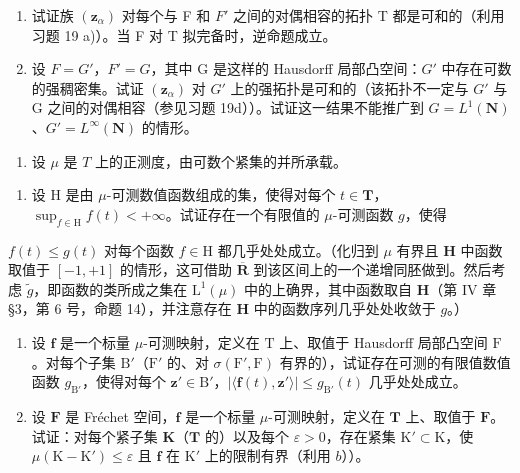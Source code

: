 \begin{enumerate}
\def\labelenumi{\alph{enumi})}
\item
  试证族 \((\mathbf{z}_{\alpha})\) 对每个与 F 和 \(F'\) 之间的对偶相容的拓扑 T 都是可和的（利用习题 19 a)）。当 F 对 T 拟完备时，逆命题成立。
\item
  设 \(F = G'\)，\(F' = G\)，其中 G 是这样的 Hausdorff 局部凸空间：\(G'\) 中存在可数的强稠密集。试证 \((\mathbf{z}_{\alpha})\) 对 \(G'\) 上的强拓扑是可和的（该拓扑不一定与 \(G'\) 与 G 之间的对偶相容（参见习题 19d））。试证这一结果不能推广到 \(G = L^{1}(\mathbf{N})\)、\(G' = L^{\infty}(\mathbf{N})\) 的情形。
\end{enumerate}

\begin{enumerate}
\def\labelenumi{\arabic{enumi})}
\setcounter{enumi}{22}
\tightlist
\item
  设 \(\mu\) 是 \(T\) 上的正测度，由可数个紧集的并所承载。
\end{enumerate}

\begin{enumerate}
\def\labelenumi{\alph{enumi})}
\tightlist
\item
  设 H 是由 \(\mu\)-可测数值函数组成的集，使得对每个 \(t \in \mathbf{T}\)，\(\sup_{f \in \mathrm{H}} f(t) < +\infty\)。试证存在一个有限值的 \(\mu\)-可测函数 \(g\)，使得
\end{enumerate}

\(f(t) \leqslant g(t)\) 对每个函数 \(f \in \mathrm{H}\) 都几乎处处成立。（化归到 \(\mu\) 有界且 \(\mathbf{H}\) 中函数取值于 \([-1, +1]\) 的情形，这可借助 \(\overline{\mathbf{R}}\) 到该区间上的一个递增同胚做到。然后考虑 \(\widetilde{g}\)，即函数的类所成之集在 \(\mathrm{L}^1(\mu)\) 中的上确界，其中函数取自 \(\mathbf{H}\)（第 IV 章 §3，第 6 号，命题 14），并注意存在 \(\mathbf{H}\) 中的函数序列几乎处处收敛于 \(g\)。）

\begin{enumerate}
\def\labelenumi{\alph{enumi})}
\setcounter{enumi}{1}
\item
  设 \(\mathbf{f}\) 是一个标量 \(\mu\)-可测映射，定义在 \(\mathrm{T}\) 上、取值于 Hausdorff 局部凸空间 \(\mathrm{F}\)。对每个子集 \(\mathrm{B}'\)（\(\mathrm{F}'\) 的、对 \(\sigma(\mathrm{F}',\mathrm{F})\) 有界的），试证存在可测的有限值数值函数 \(g_{\mathrm{B}'}\)，使得对每个 \(\mathbf{z}' \in \mathrm{B}'\)，\(|\langle \mathbf{f}(t),\mathbf{z}' \rangle| \leqslant g_{\mathrm{B}'}(t)\) 几乎处处成立。
\item
  设 \(\mathbf{F}\) 是 Fréchet 空间，\(\mathbf{f}\) 是一个标量 \(\mu\)-可测映射，定义在 \(\mathbf{T}\) 上、取值于 \(\mathbf{F}\)。试证：对每个紧子集 \(\mathbf{K}\)（\(\mathbf{T}\) 的）以及每个 \(\varepsilon > 0\)，存在紧集 \(\mathrm{K}' \subset \mathrm{K}\)，使 \(\mu(\mathrm{K} - \mathrm{K}') \leqslant \varepsilon\) 且 \(\mathbf{f}\) 在 \(\mathrm{K}'\) 上的限制有界（利用 \(b\)））。
\end{enumerate}


